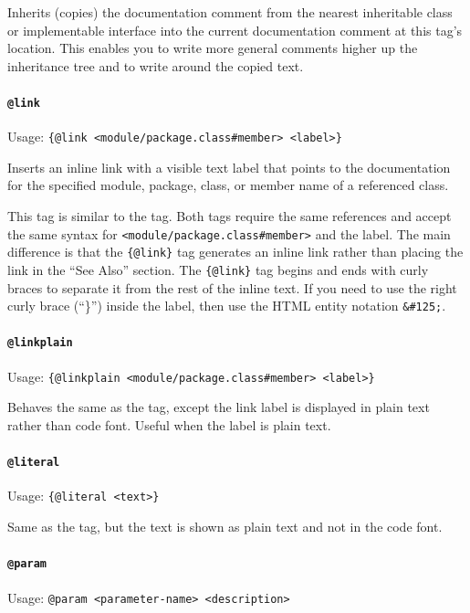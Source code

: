 \documentclass[11pt,a4paper, titlepage, parskip=half, headsepline, footsepline, cleardoublepage=current, headheight=1cm]{scrbook}
\begin{document}
Inherits (copies) the documentation comment from the nearest inheritable class or implementable interface into the current documentation comment at this tag's location. This enables you to write more general comments higher up the inheritance tree and to write around the copied text.

\paragraph{\lstinline|@link|}\label{sec:TagLink}  Usage: \lstinline|{@link <module/package.class#member> <label>}|

Inserts an inline link with a visible text label that points to the documentation for the specified module, package, class, or member name of a referenced class. 

This tag is similar to the  tag. Both tags require the same references and accept the same syntax for \verb|<module/package.class#member>| and the label. The main difference is that the \lstinline|{@link}| tag generates an inline link rather than placing the link in the “See Also” section. The \lstinline|{@link}| tag begins and ends with curly braces to separate it from the rest of the inline text. If you need to use the right curly brace (“\}”) inside the label, then use the HTML entity notation \verb|&#125;|.

\paragraph{\lstinline|@linkplain|}\label{sec:TagLinkplain}  Usage: \lstinline|{@linkplain <module/package.class#member> <label>}|

Behaves the same as the  tag, except the link label is displayed in plain text rather than code font. Useful when the label is plain text.

\paragraph{\lstinline|@literal|}\label{sec:TagLiteral}  Usage: \lstinline|{@literal <text>}| 

Same as the  tag, but the text is shown as plain text and not in the code font.

\paragraph{\lstinline|@param|}\label{sec:TagParam}  Usage: \lstinline|@param <parameter-name> <description>|
\end{document}
